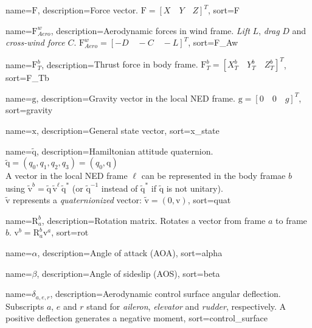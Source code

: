 {
	name={$\bm{\mathrm{F}}$},
	description={Force vector. $\bm{\mathrm{F}} = [X \quad Y \quad Z]^T$},
	sort=F
}

{
	name={$\bm{\mathrm{F}}_{Aero}^w$},
	description={Aerodynamic forces in wind frame. \textit{Lift} $L$, \textit{drag} $D$ and \textit{cross-wind force} $C$. $\bm{\mathrm{F}}_{Aero}^w = [-D \quad -C \quad -L]^T$},
	sort=F_Aw
}

{
	name={$\bm{\mathrm{F}}_T^b$},
	description={Thrust force in body frame. $\bm{\mathrm{F}}_T^b = [X_T^b \quad Y_T^b \quad Z_T^b]^T$},
	sort=F_Tb
}

{
	name={$\bm{\mathrm{g}}$},
	description={Gravity vector in the local NED frame. $\bm{\mathrm{g}} = [0 \quad 0 \quad g]^T$},
	sort=gravity
}

{
	name={$\bm{\mathrm{x}}$},
	description={General state vector},
	sort=x_state
}

{
	name={$\bm{\mathrm{\tilde{q}}}$},
	description={Hamiltonian attitude quaternion.
				 $\bm{\mathrm{\tilde{q}}} = (q_0, q_1, q_2, q_3) = (q_0, \bm{\mathrm{q}})$\\
				 A vector in the local NED frame $\ell$ can be represented in the body framae $b$ using
				 $\bm{\mathrm{\tilde{v}}}^b = \bm{\mathrm{\tilde{q}}} \, \bm{\mathrm{\tilde{v}}}^\ell \, \bm{\mathrm{\tilde{q}}}^*$ (or $\bm{\mathrm{\tilde{q}}}^{-1}$
				 instead of $\bm{\mathrm{\tilde{q}}}^*$ if $\bm{\mathrm{\tilde{q}}}$ is not unitary).\\
				 $\bm{\mathrm{\tilde{v}}}$ represents a \textit{quaternionized} vector: $\bm{\mathrm{\tilde{v}}} = (0,\bm{\mathrm{v}})$},
	sort=quat
}

{
	name={$\bm{\mathrm{R}}_a^b$},
	description={Rotation matrix. Rotates a vector from frame $a$ to frame $b$. $\bm{\mathrm{v}}^b = \bm{\mathrm{R}}_a^b \bm{\mathrm{v}}^a$},
	sort=rot
}

{
	name={$\alpha$},
	description={Angle of attack (AOA)},
	sort=alpha
}

{
	name={$\beta$},
	description={Angle of sideslip (AOS)},
	sort=beta
}

{
	name={$\delta_{a,e,r}$},
	description={Aerodynamic control surface angular deflection. Subscripts $a$, $e$ and $r$ stand for \textit{aileron}, \textit{elevator} and \textit{rudder}, respectively. A positive deflection generates a negative moment},
	sort=control_surface
}

